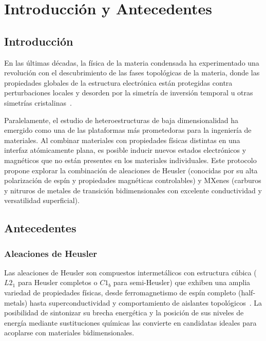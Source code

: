 \section{Introducción y Antecedentes}
\label{sec:intro}

\subsection{Introducción}
En las últimas décadas, la física de la materia condensada ha experimentado una revolución con el descubrimiento de las fases topológicas de la materia, donde las propiedades globales de la estructura electrónica están protegidas contra perturbaciones locales y desorden por la simetría de inversión temporal u otras simetrías cristalinas~\cite{bansil2016colloquium}. 

Paralelamente, el estudio de heteroestructuras de baja dimensionalidad ha emergido como una de las plataformas más prometedoras para la ingeniería de materiales. Al combinar materiales con propiedades físicas distintas en una interfaz atómicamente plana, es posible inducir nuevos estados electrónicos y magnéticos que no están presentes en los materiales individuales. Este protocolo propone explorar la combinación de aleaciones de Heusler (conocidas por su alta polarización de espín y propiedades magnéticas controlables) y MXenes (carburos y nitruros de metales de transición bidimensionales con excelente conductividad y versatilidad superficial).

\subsection{Antecedentes}

\subsubsection{Aleaciones de Heusler}
Las aleaciones de Heusler son compuestos intermetálicos con estructura cúbica ($L2_1$ para Heusler completos o $C1_b$ para semi-Heusler) que exhiben una amplia variedad de propiedades físicas, desde ferromagnetismo de espín completo (half-metals) hasta superconductividad y comportamiento de aislantes topológicos~\cite{graf2011simple}. La posibilidad de sintonizar su brecha energética y la posición de sus niveles de energía mediante sustituciones químicas las convierte en candidatas ideales para acoplarse con materiales bidimensionales.

